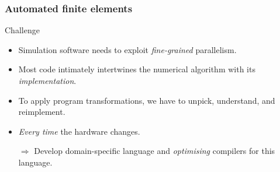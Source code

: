 \documentclass[presentation,aspectratio=43,10pt]{beamer}
\begin{document}
\begin{frame}
  \frametitle{Automated finite elements}
  \begin{challenge}{Challenge}
  \begin{itemize}
  \item Simulation software needs to exploit \emph{fine-grained}
    parallelism.
  \item Most code intimately intertwines the numerical algorithm with
    its \emph{implementation}.
  \item To apply program transformations, we have to unpick,
    understand, and reimplement.
  \item \emph{Every time} the hardware changes.

  \item[$\Rightarrow$] Develop domain-specific language and
    \emph{optimising} compilers for this language.
  \end{itemize}
  \end{challenge}
\end{frame}
\end{document}
